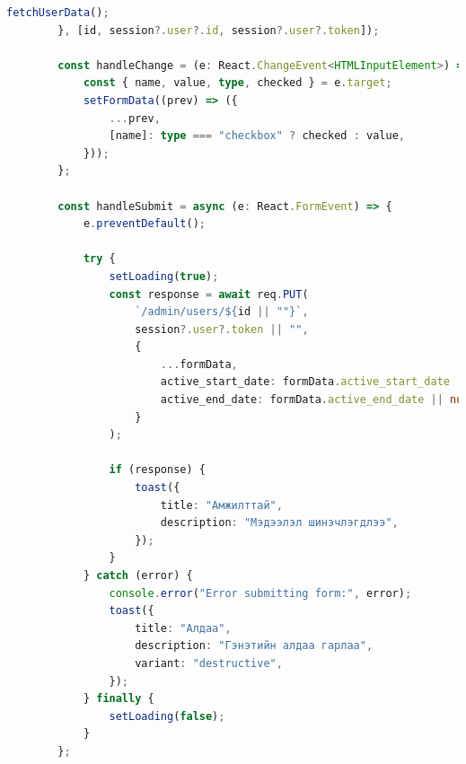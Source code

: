 \begin{lstlisting}[language=Typescript, frame=single]
			fetchUserData();
		}, [id, session?.user?.id, session?.user?.token]);
	
		const handleChange = (e: React.ChangeEvent<HTMLInputElement>) => {
			const { name, value, type, checked } = e.target;
			setFormData((prev) => ({
				...prev,
				[name]: type === "checkbox" ? checked : value,
			}));
		};
	
		const handleSubmit = async (e: React.FormEvent) => {
			e.preventDefault();
	
			try {
				setLoading(true);
				const response = await req.PUT(
					`/admin/users/${id || ""}`,
					session?.user?.token || "",
					{
						...formData,
						active_start_date: formData.active_start_date || null,
						active_end_date: formData.active_end_date || null,
					}
				);
	
				if (response) {
					toast({
						title: "Амжилттай",
						description: "Мэдээлэл шинэчлэгдлээ",
					});
				}
			} catch (error) {
				console.error("Error submitting form:", error);
				toast({
					title: "Алдаа",
					description: "Гэнэтийн алдаа гарлаа",
					variant: "destructive",
				});
			} finally {
				setLoading(false);
			}
		};
	

\end{lstlisting}
